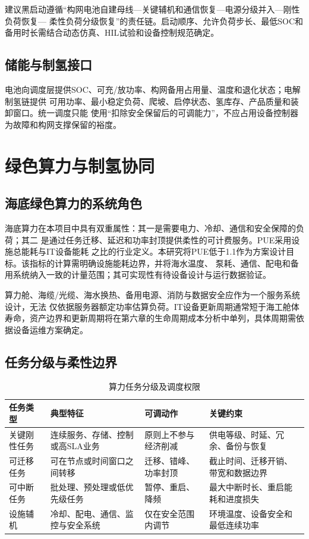 建议黑启动遵循“构网电池自建母线—关键辅机和通信恢复—电源分级并入—刚性负荷恢复—
柔性负荷分级恢复”的责任链。启动顺序、允许负荷步长、最低SOC和备用时长需结合动态仿真、HIL试验和设备控制规范确定。

\subsection{储能与制氢接口}

电池向调度层提供SOC、可充/放功率、构网备用占用量、温度和退化状态；电解制氢链提供
可用功率、最小稳定负荷、爬坡、启停状态、氢库存、产品质量和装卸窗口。统一调度只能
使用“扣除安全保留后的可调能力”，不应占用设备控制器为故障和构网支撑保留的裕度。

\section{绿色算力与制氢协同}

\subsection{海底绿色算力的系统角色}

海底算力在本项目中具有双重属性：其一是需要电力、冷却、通信和安全保障的负荷；其二
是通过任务迁移、延迟和功率封顶提供柔性的可计费服务。PUE采用设施总能耗与IT设备能耗
之比的行业定义\cite{green-grid-pue,doe-pue}。本研究将PUE低于1.1作为方案设计目标。该指标的计算需明确设施能耗边界，并将海水温度、
泵耗、通信、配电和备用系统纳入一致的计量范围；其可实现性有待设备设计与运行数据验证。

算力舱、海缆/光缆、海水换热、备用电源、消防与数据安全应作为一个服务系统设计，无法
仅依据服务器额定功率估算负荷。IT设备更新周期通常短于海工舱体寿命，资产边界和更新周期将在第六章的生命周期成本分析中单列，具体周期需依据设备运维方案确定。

\subsection{任务分级与柔性边界}

\begin{table}[H]
\centering
\caption{算力任务分级及调度权限}
\label{tab:c3-compute-classes}
\begin{tabularx}{\textwidth}{p{2.5cm} X X X}
\toprule
任务类型 & 典型特征 & 可调动作 & 关键约束\\
\midrule
关键刚性任务 & 连续服务、存储、控制或高SLA业务 & 原则上不参与经济削减 & 供电等级、时延、冗余、备份与恢复\\
可迁移任务 & 可在节点或时间窗口之间转移 & 迁移、错峰、功率封顶 & 截止时间、迁移开销、带宽和数据边界\\
可中断任务 & 批处理、预处理或低优先级任务 & 暂停、重启、降频 & 最大中断时长、重启能耗和进度损失\\
设施辅机 & 冷却、配电、通信、监控与安全系统 & 仅在安全范围内调节 & 环境温度、设备安全和最低连续功率\\
\bottomrule
\end{tabularx}
\end{table}

